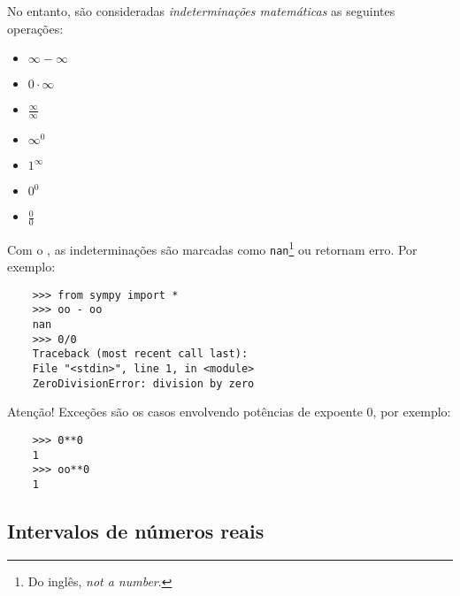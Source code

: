 No entanto, são consideradas \emph{indeterminações matemáticas} as seguintes operações:
\begin{itemize}
\item $\infty - \infty$
\item $0\cdot\infty$
\item $\displaystyle\frac{\infty}{\infty}$
\item $\infty^0$
\item $1^\infty$
\item $0^0$
\item $\displaystyle\frac{0}{0}$
\end{itemize}

\ifispython
\begin{obs}
  Com o \sympy, as indeterminações são marcadas como \lstinline!nan!\footnote{Do inglês, {\it not a number}.} ou retornam erro. Por exemplo:
  \begin{lstlisting}
    >>> from sympy import *
    >>> oo - oo
    nan
    >>> 0/0
    Traceback (most recent call last):
    File "<stdin>", line 1, in <module>
    ZeroDivisionError: division by zero
  \end{lstlisting}
  Atenção! Exceções são os casos envolvendo potências de expoente $0$, por exemplo:
  \begin{lstlisting}
    >>> 0**0
    1
    >>> oo**0
    1
  \end{lstlisting}
\end{obs}
\fi

\subsection{Intervalos de números reais}

